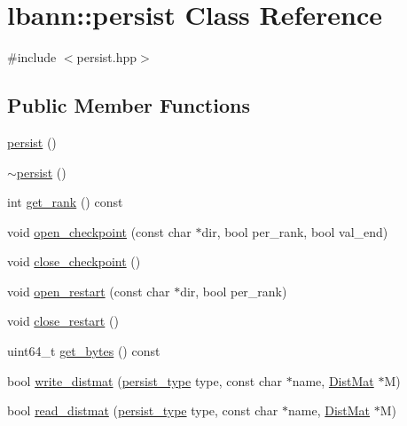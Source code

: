 \hypertarget{classlbann_1_1persist}{}\section{lbann\+:\+:persist Class Reference}
\label{classlbann_1_1persist}


{\ttfamily \#include $<$persist.\+hpp$>$}

\subsection*{Public Member Functions}
\begin{DoxyCompactItemize}
\item 
\hyperlink{classlbann_1_1persist_abf1454f4d5b61617ccfa60ba9989f1a3}{persist} ()
\item 
\hyperlink{classlbann_1_1persist_ac0d475c0174f7dbd805a0b0603277cfa}{$\sim$persist} ()
\item 
int \hyperlink{classlbann_1_1persist_a34eb918a890ab49dcbeedddf27ec1616}{get\+\_\+rank} () const
\item 
void \hyperlink{classlbann_1_1persist_a32a8f71995b674a62b21087ec4be9575}{open\+\_\+checkpoint} (const char $\ast$dir, bool per\+\_\+rank, bool val\+\_\+end)
\item 
void \hyperlink{classlbann_1_1persist_ab099939d0d91101fbfaf2b85e78be032}{close\+\_\+checkpoint} ()
\item 
void \hyperlink{classlbann_1_1persist_a123cbc1d2b693640c784a45cbc6d2d97}{open\+\_\+restart} (const char $\ast$dir, bool per\+\_\+rank)
\item 
void \hyperlink{classlbann_1_1persist_afeef05548e1d17bd09d3805607edd621}{close\+\_\+restart} ()
\item 
uint64\+\_\+t \hyperlink{classlbann_1_1persist_ad759657d69e88a491729ce8e4bf9510e}{get\+\_\+bytes} () const
\item 
bool \hyperlink{classlbann_1_1persist_a9170de652405d86d9ba9b3793f8781c6}{write\+\_\+distmat} (\hyperlink{namespacelbann_adee41f31f15f3906cbdcce4a1417eb56}{persist\+\_\+type} type, const char $\ast$name, \hyperlink{base_8hpp_a0fab5387556805cfeac3e7e567bf66c5}{Dist\+Mat} $\ast$M)
\item 
bool \hyperlink{classlbann_1_1persist_aa98be93f33b510e5b506b61de6bd79bd}{read\+\_\+distmat} (\hyperlink{namespacelbann_adee41f31f15f3906cbdcce4a1417eb56}{persist\+\_\+type} type, const char $\ast$name, \hyperlink{base_8hpp_a0fab5387556805cfeac3e7e567bf66c5}{Dist\+Mat} $\ast$M)
\item 

\end{DoxyCompactItemize}
